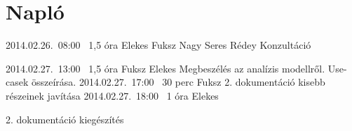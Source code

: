 %
\section{Napló}

\begin{naplo}


\bejegyzes
{2014.02.26.~08:00~}
{1,5 óra}
{Elekes\newline
Fuksz\newline
Nagy\newline
Seres\newline
Rédey}
{Konzultáció}
	
\bejegyzes
{2014.02.27.~13:00~}
{1,5 óra}
{Fuksz\newline
Elekes}
{Megbeszélés az analízis modellről. Use-casek összeírása.}
\bejegyzes
{2014.02.27.~17:00~}
{30 perc}
{Fuksz}
{2. dokumentáció kisebb részeinek javítása}
\bejegyzes
{2014.02.27.~18:00~}
{1 óra}
{Elekes}
{2. dokumentáció kiegészítés

}
\end{naplo}

